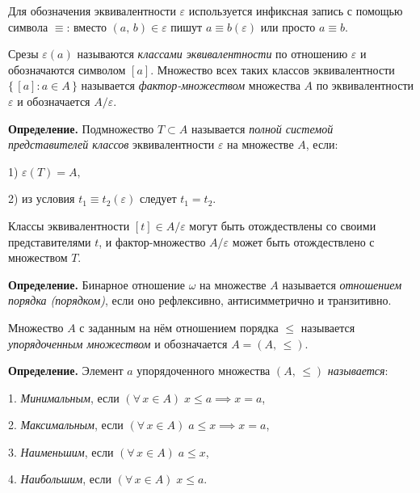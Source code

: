 \documentclass[spec, och, otchet, hidelinks]{SCWorks}
\begin{document}
\par Для обозначения эквивалентности $ \varepsilon $ используется инфиксная запись с помощью 
символа $ \equiv $: вместо $ (a,\, b) \in \varepsilon $ пишут $ a \equiv b(\varepsilon) $ или 
просто $ a \equiv b $.

\par Срезы $ \varepsilon(a) $ называются \textit{классами эквивалентности} по отношению 
$ \varepsilon $ и обозначаются символом $ [a] $. Множество всех таких классов эквивалентности
$ \{\,[a] : a\in A\,\} $ называется \textit{фактор-множеством} множества $ A $ по эквивалентности 
$ \varepsilon $ и обозначается $ A / \varepsilon $. \\

\par \textbf{Определение.} Подмножество $ T \subset A $ называется \textit{полной системой
представителей классов} эквивалентности $ \varepsilon $ на множестве $ A $, если: 
\par 1) $ \varepsilon(T) = A, $
\par 2) из условия $ t_1 \equiv t_2(\varepsilon) $ следует $ t_1 = t_2 $. 

\par Классы эквивалентности $ [t] \in A / \varepsilon $ могут быть отождествлены со своими 
представителями $ t $, и фактор-множество $ A / \varepsilon $ может быть отождествлено с множеством
$ T $. \\

\par \textbf{Определение.} Бинарное отношение $ \omega $ на множестве $ A $ называется 
\textit{отношением порядка (порядком)}, если оно рефлексивно, антисимметрично и транзитивно.

\par Множество $ A $ с заданным на нём отношением порядка $ \leq $ называется 
\textit{упорядоченным множеством} и обозначается $ A = (A,\, \leq) $. \\

\par \textbf{Определение.} Элемент $ a $ упорядоченного множества $ (A,\,\leq) $ \textit{называется}:
\par 1. \textit{Минимальным}, если $ (\forall \, x \in A) \; x \leq a \implies x = a $, 
\par 2. \textit{Максимальным}, если $ (\forall \, x \in A) \; a \leq x \implies x = a $, 
\par 3. \textit{Наименьшим}, если $ (\forall \, x \in A) \; a \leq x $,
\par 4. \textit{Наибольшим}, если $ (\forall \, x \in A) \; x \leq a $.
\end{document}
